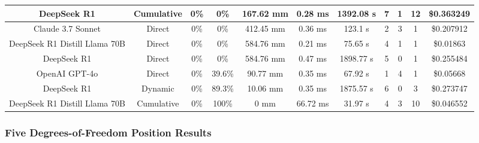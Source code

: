 \begin{landscape}
\begin{table}[H]
\begin{center}
\begin{tabular}{|c|c|c|c|c|c|c|c|c|c|c|}
    \hline
    DeepSeek R1 & Cumulative & 0\% & 0\% & 167.62 mm & 0.28 ms & 1392.08 s & 7 & 1 & 12 & \$0.363249 \\
    \hline
    Claude 3.7 Sonnet & Direct & 0\% & 0\% & 412.45 mm & 0.36 ms & 123.1 s & 2 & 3 & 1 & \$0.207912 \\
    \hline
    DeepSeek R1 Distill Llama 70B & Direct & 0\% & 0\% & 584.76 mm & 0.21 ms & 75.65 s & 4 & 1 & 1 & \$0.01863 \\
    \hline
    DeepSeek R1 & Direct & 0\% & 0\% & 584.76 mm & 0.47 ms & 1898.77 s & 5 & 0 & 1 & \$0.255484 \\
    \hline
    OpenAI GPT-4o & Direct & 0\% & 39.6\% & 90.77 mm & 0.35 ms & 67.92 s & 1 & 4 & 1 & \$0.05668 \\
    \hline
    DeepSeek R1 & Dynamic & 0\% & 89.3\% & 10.06 mm & 0.35 ms & 1875.57 s & 6 & 0 & 3 & \$0.273747 \\
    \hline
    DeepSeek R1 Distill Llama 70B & Cumulative & 0\% & 100\% & 0 mm & 66.72 ms & 31.97 s & 4 & 3 & 10 & \$0.046552 \\
    \hline
\end{tabular}
\label{Results-Position-3-6}
\end{center}
\end{table}

\subsubsection{Five Degrees-of-Freedom Position Results}


\end{landscape}
